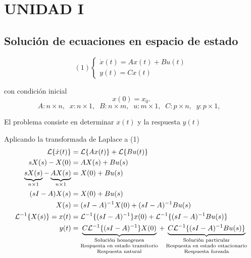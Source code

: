 \section{UNIDAD I}
\subsection{Solución de ecuaciones en espacio de estado}

\[
    (1)
    \left\{
        \begin{array}{lll}
            \dot{x}(t) = Ax(t) + Bu(t)\\
            y(t) = Cx(t)
        \end{array}
    \right.
\]

con condición inicial
\[ x(0) = x_{0}.\]
\[
A:n\times n,\;\; 
x:n\times 1,\;\;
B:n\times m,\;\;
u:m\times 1,\;\;
C:p\times n,\;\;
y:p\times 1,\;\;
\]

El problema consiste en determinar \(x(t)\) y la respuesta \(y(t)\)

Aplicando la transformada de Laplace a (1)
\[
\begin{split}
    \mathcal{L} \{ \dot{x}(t) \} & = \mathcal{L} \{ Ax(t) \} + \mathcal{L} \{ Bu(t) \} \\
    sX(s) - X(0) & = AX(s) + Bu(s)\\
    \underbrace{sX(s)}_{n\times1} - \underbrace{AX(s)}_{n\times1} & = X(0) + Bu(s)\\
    (sI-A)X(s) & = X(0) + Bu(s) \\
    X(s) & = (sI-A)^{-1}X(0) + (sI-A)^{-1}Bu(s) \\
    \mathcal{L}^{-1} \{ X(s) \} = x(t) & = \mathcal{L}^{-1} \{ (sI-A)^{-1} \} x(0) + \mathcal{L}^{-1} \{ (sI-A)^{-1}Bu(s) \} \\
    y(t) & = 
        \underbrace{C\mathcal{L}^{-1} \{ (sI-A)^{-1} \}X(0)}_
        {
        \begin{scriptsize}
            \begin{matrix}
                \text{Solución homogenea}\\
                \text{Respuesta en estado transitorio}\\
                \text{Respuesta natural}\\
            \end{matrix}
        \end{scriptsize}
        }+
        \underbrace{C\mathcal{L}^{-1} \{ (sI-A)^{-1}Bu(s) \}}_
        {
        \begin{scriptsize}
            \begin{matrix}
                \text{Solución particular}\\
                \text{Respuesta en estado estacionario}\\
                \text{Respuesta forzada}\\
            \end{matrix}
        \end{scriptsize}
        }
\end{split}
\]